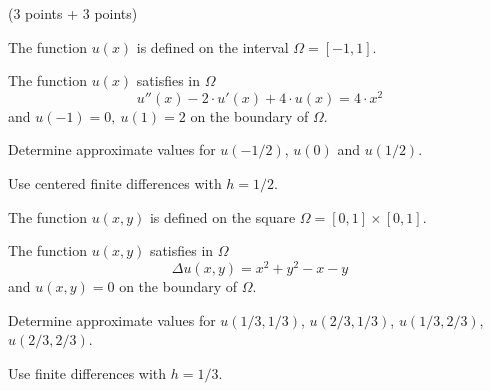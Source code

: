 (3 points + 3 points)
\begin{teilaufgaben}
\item
The function $u(x)$ is defined on the interval $\Omega = [-1,1].$ 

The function $u(x)$ satisfies in $\Omega$ 
\[
u''(x) - 2 \cdot u'(x) + 4 \cdot u(x)
=
4 \cdot x^2
\]
and  $u(-1) = 0, \ u(1) = 2$ on the boundary of $\Omega$. 

Determine approximate values for $u(-1/2)$, $u(0)$ and $u(1/2)$. 

Use centered finite differences with $h = 1/2$. 

\item
The function $u(x,y)$ is defined on the square $\Omega = [0, 1] \times [0,1]$.

The function $u(x,y)$ satisfies in $\Omega$
\[
\Delta u(x,y) = x^2 + y^2 - x - y
\]
and $u(x,y) = 0$ on the boundary of $\Omega$.

Determine approximate values for
$u(1/3,1/3)$, $u(2/3,1/3)$, $u(1/3,2/3)$, $u(2/3,2/3)$.

Use finite differences with $h = 1/3.$
\end{teilaufgaben}

